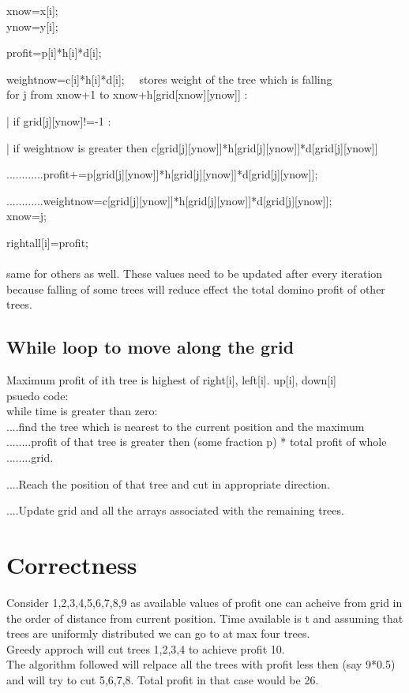 \documentclass[12pt]{article}
\begin{document}
xnow=x[i];
\\

ynow=y[i];

profit=p[i]*h[i]*d[i];

weightnow=c[i]*h[i]*d[i]; \ \ stores weight of the tree which is falling\\


for j from xnow+1 to xnow+h[grid[xnow][ynow]] :

 |    if grid[j][ynow]!=-1 : 

|        if weightnow is greater then c[grid[j][ynow]]*h[grid[j][ynow]]*d[grid[j][ynow]]  


                    ............profit+=p[grid[j][ynow]]*h[grid[j][ynow]]*d[grid[j][ynow]];
                   


 ............weightnow=c[grid[j][ynow]]*h[grid[j][ynow]]*d[grid[j][ynow]];\\


                    xnow=j;



        rightall[i]=profit;\\ \\ 
same for others as well. These values need to be updated after every iteration because falling of some trees will reduce effect the total domino profit of other trees.\\

   
\subsection{While loop to move along the grid}
Maximum profit of ith tree is highest of right[i], left[i]. up[i], down[i]\\

psuedo code:\\

while time is greater than zero:\\

....find the tree which is nearest to the current position and the maximum ........profit of that tree is greater then (some fraction p) * total profit of whole ........grid.

....Reach the position of that tree and cut in appropriate direction.

....Update grid and all the arrays associated with the remaining trees.\\ 

\section{Correctness}
Consider 1,2,3,4,5,6,7,8,9 as available values of profit one can acheive from grid in the order of distance from current position. Time available is t and assuming that trees are uniformly distributed we can go to at max four trees.\\
Greedy approch will cut trees 1,2,3,4 to achieve profit 10.\\
The algorithm followed will relpace all the trees with profit less then (say 9*0.5) and will try to cut 5,6,7,8. Total profit in that case would be 26.
\end{document}
